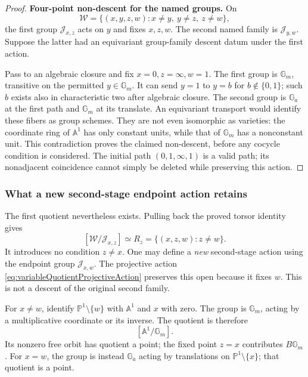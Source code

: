 \documentclass[11pt,a4paper]{article}
\theoremstyle{named}\newtheorem{finding}{Finding}[section]
\theoremstyle{definition}\newtheorem{definition}[finding]{Definition}
\theoremstyle{remark}\newtheorem{remark}[finding]{Remark}
\begin{document}
\begin{proof}
\par\smallskip\noindent\textbf{Four-point non-descent for the named groups.}\quad
On
\[
 \mathcal W=\{(x,y,z,w):x\ne y,\ y\ne z,\ z\ne w\},
\]
the first group \(\mathcal J_{x,z}\) acts on \(y\)
and fixes \(x,z,w\).
The second named family is \(\mathcal J_{y,w}\).
Suppose the latter had an equivariant group-family
descent datum under the first action.

Pass to an algebraic closure and fix
\(x=0,z=\infty,w=1\).
The first group is \(\mathbb G_m\), transitive on
the permitted \(y\in\mathbb G_m\).
It can send \(y=1\) to \(y=b\) for
\(b\notin\{0,1\}\); such \(b\) exists also in
characteristic two after algebraic closure.
The second group is \(\mathbb G_a\) at the first
path and \(\mathbb G_m\) at its translate.
An equivariant transport would identify these fibers
as group schemes.
They are not even isomorphic as varieties:
the coordinate ring of \(\mathbb A^1\) has only
constant units, while that of \(\mathbb G_m\)
has a nonconstant unit.
This contradiction proves the claimed non-descent,
before any cocycle condition is considered.
The initial path \((0,1,\infty,1)\) is a valid path;
its nonadjacent coincidence cannot simply be deleted
while preserving this action.
\end{proof}

\subsubsection{What a new second-stage endpoint action retains}

The first quotient nevertheless exists. Pulling
back the proved torsor identity gives
\[
 [\mathcal W/\mathcal J_{x,z}]
       \simeq R_z=\{(x,z,w):z\ne w\}.
\]
It introduces no condition \(z\ne x\).
One may define a \emph{new} second-stage action
using the endpoint group \(\mathcal J_{x,w}\).
The projective action
\eqref{eq:variableQuotientProjectiveAction}
preserves this open because it fixes \(w\).
This is not a descent of the original second family.

For \(x\ne w\), identify
\(\mathbb P^1\setminus\{w\}\) with \(\mathbb A^1\)
and \(x\) with zero.
The group is \(\mathbb G_m\), acting by a multiplicative
coordinate or its inverse.
The quotient is therefore
\[
                         [\mathbb A^1/\mathbb G_m].
\]
Its nonzero free orbit has quotient a point;
the fixed point \(z=x\) contributes \(B\mathbb G_m\).
For \(x=w\), the group is instead \(\mathbb G_a\)
acting by translations on \(\mathbb P^1\setminus\{x\}\);
that quotient is a point.
\end{document}
